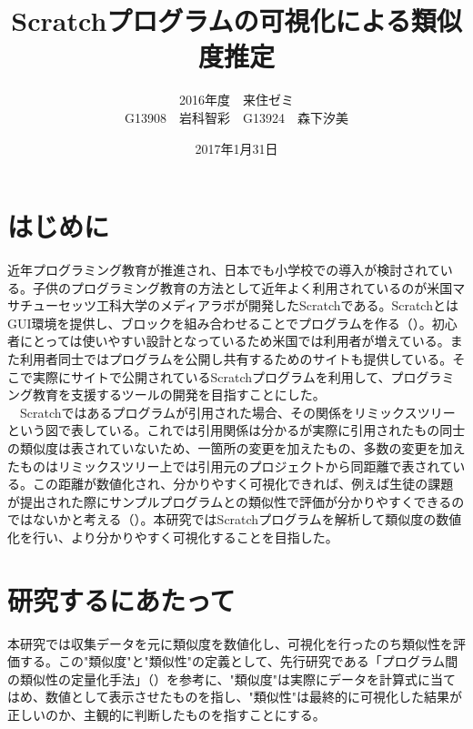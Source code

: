 \documentclass[twocolumn,9pt,a4paper]{jsarticle}
\title{Scratchプログラムの可視化による類似度推定}
\author{2016年度　来住ゼミ
\\
G13908　岩科智彩　G13924　森下汐美}
\date{2017年1月31日}
\begin{document}
\maketitle
%
%
\section{はじめに}
近年プログラミング教育が推進され、日本でも小学校での導入が検討されている。子供のプログラミング教育の方法として近年よく利用されているのが米国マサチューセッツ工科大学のメディアラボが開発したScratchである。ScratchとはGUI環境を提供し、ブロックを組み合わせることでプログラムを作る（\cite{scratch}）。初心者にとっては使いやすい設計となっているため米国では利用者が増えている。また利用者同士ではプログラムを公開し共有するためのサイトも提供している。そこで実際にサイトで公開されているScratchプログラムを利用して、プログラミング教育を支援するツールの開発を目指すことにした。
\\
　Scratchではあるプログラムが引用された場合、その関係をリミックスツリーという図で表している。これでは引用関係は分かるが実際に引用されたもの同士の類似度は表されていないため、一箇所の変更を加えたもの、多数の変更を加えたものはリミックスツリー上では引用元のプロジェクトから同距離で表されている。この距離が数値化され、分かりやすく可視化できれば、例えば生徒の課題が提出された際にサンプルプログラムとの類似性で評価が分かりやすくできるのではないかと考える（\cite{preEssay1}）。本研究ではScratchプログラムを解析して類似度の数値化を行い、より分かりやすく可視化することを目指した。

\section{研究するにあたって}
本研究では収集データを元に類似度を数値化し、可視化を行ったのち類似性を評価する。この"類似度"と"類似性"の定義として、先行研究である「プログラム間の類似性の定量化手法」（\cite{preEssay2}）を参考に、"類似度"は実際にデータを計算式に当てはめ、数値として表示させたものを指し、"類似性"は最終的に可視化した結果が正しいのか、主観的に判断したものを指すことにする。
\end{document}
